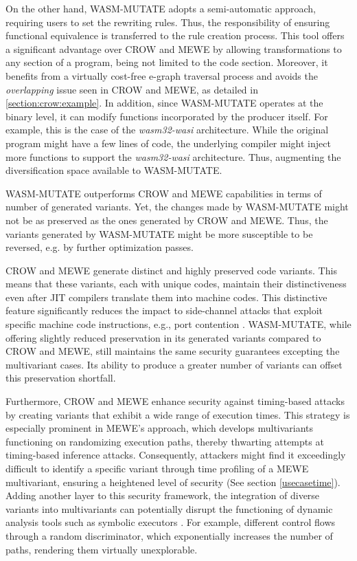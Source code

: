 On the other hand, WASM-MUTATE adopts a semi-automatic approach, requiring users to set the rewriting rules. Thus, the responsibility of ensuring functional equivalence is transferred to the rule creation process.
This tool offers a significant advantage over CROW and MEWE by allowing transformations to any section of a \wasm program, being not limited to the code section. 
Moreover, it benefits from a virtually cost-free e-graph traversal process and avoids the \emph{overlapping}  issue seen in CROW and MEWE, as detailed in \autoref{section:crow:example}. 
In addition, since WASM-MUTATE operates at the binary level, it can modify functions incorporated by the \Wasm producer itself.
For example, this is the case of the \emph{wasm32-wasi} architecture.
While the original program might have a few lines of code, the underlying compiler might inject more functions to support the \emph{wasm32-wasi} architecture.
Thus, augmenting the diversification space available to WASM-MUTATE.

WASM-MUTATE outperforms CROW and MEWE capabilities in terms of number of generated variants.
Yet, the changes made by WASM-MUTATE might not be as preserved as the ones generated by CROW and MEWE.
Thus, the variants generated by WASM-MUTATE might be more susceptible to be reversed, e.g. by further optimization passes.


CROW and MEWE generate distinct and highly preserved code variants. 
This means that these variants, each with unique \Wasm codes, maintain their distinctiveness even after JIT compilers translate them into machine codes. 
This distinctive feature significantly reduces the impact to side-channel attacks that exploit specific machine code instructions, e.g., port contention \cite{10.1145/3488932.3517411}.
WASM-MUTATE, while offering slightly reduced preservation in its generated variants compared to CROW and MEWE, still maintains the same security guarantees excepting the multivariant cases.
Its ability to produce a greater number of variants can offset this preservation shortfall.


Furthermore, CROW and MEWE enhance security against timing-based attacks by creating variants that exhibit a wide range of execution times. 
This strategy is especially prominent in MEWE’s approach, which develops multivariants functioning on randomizing execution paths, thereby thwarting attempts at timing-based inference attacks. 
Consequently, attackers might find it exceedingly difficult to identify a specific variant through time profiling of a MEWE multivariant, ensuring a heightened level of security (See section \autoref{usecasetime}).
Adding another layer to this security framework, the integration of diverse variants into multivariants can potentially disrupt the functioning of dynamic analysis tools such as symbolic executors \cite{opaque predicate}. 
For example, different control flows through a random discriminator, which exponentially increases the number of paths, rendering them virtually unexplorable.



